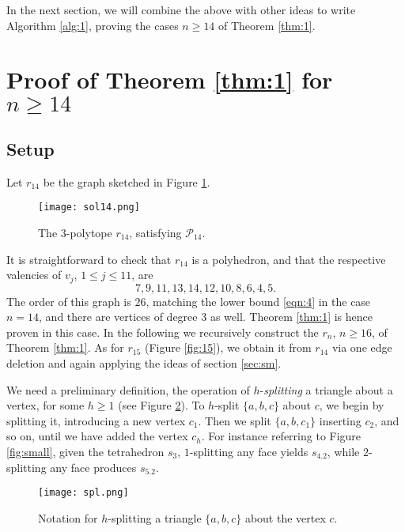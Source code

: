 \documentclass[11pt]{article}
\theoremstyle{definition}
\numberwithin{equation}{section}
\def\calP{\mathcal{P}}
\begin{document}
In the next section, we will combine the above with other ideas to write Algorithm \ref{alg:1}, proving the cases $n\geq 14$ of Theorem \ref{thm:1}.


\section{Proof of Theorem \ref{thm:1} for $n\geq 14$}
\label{sec:alg1}
\subsection{Setup}
Let $r_{14}$ be the graph sketched in Figure \ref{fig:14}.
\begin{figure}[h!]
	\centering
	\texttt{[image: sol14.png]}
	\caption{The $3$-polytope $r_{14}$, satisfying $\calP_{14}$.} %
	\label{fig:14}
\end{figure}
It is straightforward to check that $r_{14}$ is a polyhedron, and that the respective valencies of $v_j$, $1\leq j\leq 11$, are
\[7,9,11,13,14,12,10,8,6,4,5.\]
The order of this graph is $26$, matching the lower bound \eqref{eqn:4} in the case $n=14$, and there are vertices of degree $3$ as well. Theorem \ref{thm:1} is hence proven in this case. In the following we recursively construct the $r_n$, $n\geq 16$, of Theorem \ref{thm:1}. As for $r_{15}$ (Figure \ref{fig:15}), we obtain it from $r_{14}$ via one edge deletion and again applying the ideas of section \ref{sec:sm}.

We need a preliminary definition, the operation of $\mathit{h}$-\textit{splitting} a triangle about a vertex, for some $h\geq 1$ (see Figure \ref{fig:spl}). To $h$-split $\{a,b,c\}$ about $c$, we begin by splitting it, introducing a new vertex $c_1$. Then we split $\{a,b,c_1\}$ inserting $c_2$, and so on, until we have added the vertex $c_h$. For instance referring to Figure \ref{fig:small}, given the tetrahedron $s_3$, $1$-splitting any face yields $s_{4.2}$, while $2$-splitting any face produces $s_{5.2}$.
\begin{figure}[h!]
	\centering
	\texttt{[image: spl.png]}
	\caption{Notation for $h$-splitting a triangle $\{a,b,c\}$ about the vertex $c$.}
	\label{fig:spl}
\end{figure}
\end{document}
